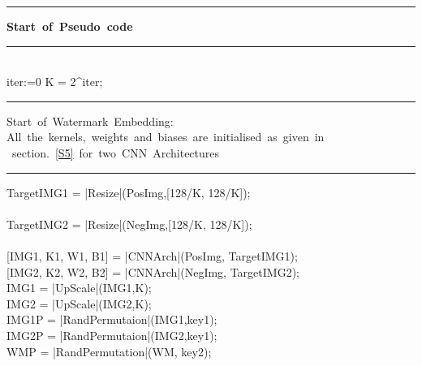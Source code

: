 \begin{spacing}{1.2}
{\small
\begin{program}

\noindent\rule{\linewidth}{1pt}
\mbox{\bf Start of Pseudo code}
\noindent\rule{\linewidth}{1pt}
\BEGIN \\ %
  \FOR iter:=0    \DO
  	 K = 2^{iter};
    \rule{\linewidth}{0.2pt}
  	 \mbox{Start of Watermark Embedding:} 
  	 \mbox{All the kernels, weights and biases are  initialised as given in}
  	 \mbox{ section. \ref{S5} for two CNN Architectures }
  	 
	  \rule{\linewidth}{0.2pt}
  	 	TargetIMG1 = |Resize|(PosImg,[128/K, 128/K]);\\ \\
  	  
  	 	TargetIMG2 = |Resize|(NegImg,[128/K, 128/K]);\\ \\

  	 	[IMG1, K1, W1, B1] = |CNNArch|(PosImg, TargetIMG1);\\
  	 
  	 	[IMG2, K2, W2, B2] = |CNNArch|(NegImg, TargetIMG2);\\
  	 
  	 	IMG1 = |UpScale|(IMG1,K); \\
  	 
  	 	IMG2 = |UpScale|(IMG2,K); \\
  	 
  	 	IMG1P = |RandPermutaion|(IMG1,key1);\\
  	 
  	 	IMG2P = |RandPermutaion|(IMG2,key1);\\
  	 
  	 	WMP = |RandPermutation|(WM, key2);\\
  	 

\end{program}}
\end{spacing}
